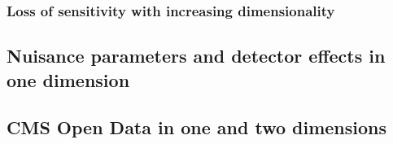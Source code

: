 \documentclass[aps,prd,reprint,groupedaddress]{revtex4-2}
\begin{document}
\subsubsection{Loss of sensitivity with increasing dimensionality}
\subsection{Nuisance parameters and detector effects in one dimension}
\subsection{CMS Open Data in one and two dimensions}



%


\end{document}
